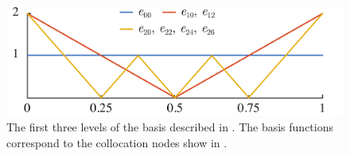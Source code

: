 \begin{figure}[t]
  \centering
  \includegraphics[width=1.0\columnwidth]{include/assets/figures/basis.pdf}
  \vspace{-1.5em}
  \caption{
    The first three levels of the basis described in . The basis
    functions correspond to the collocation nodes show in .
  }
\end{figure}
